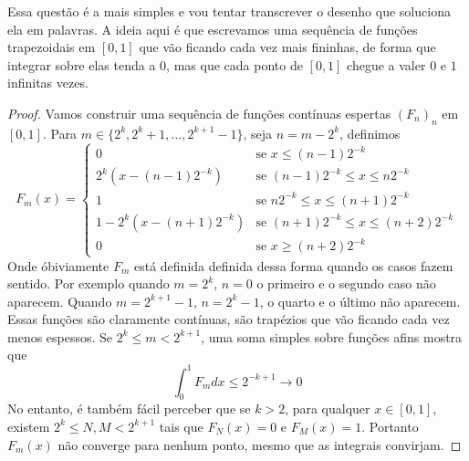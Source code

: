 \begin{problem}
    \label{prob:l3:5}
\end{problem}
Essa questão é a mais simples e vou tentar transcrever o desenho que soluciona ela em palavras.
A ideia aqui é que escrevamos uma sequência de funções trapezoidais em $[0,1]$ que vão ficando cada vez mais fininhas,
de forma que integrar sobre elas tenda a $0$, mas que cada ponto de $[0,1]$ chegue a valer $0$ e $1$ infinitas vezes.
\begin{proof}
    Vamos construir uma sequência de funções contínuas espertas $(F_n)_n$ em $[0,1]$.
    Para $m \in \{2^k, 2^k + 1, \dots, 2^{k+1} - 1\}$, seja $n = m - 2^k$, definimos
    $$F_{m}(x) = \begin{cases}
        0 & \text{se }  x \leq (n - 1)2^{-k}\\
        2^k(x - (n-1)2^{-k}) & \text{se } (n-1)2^{-k} \leq x \leq n2^{-k}\\
        1 &\text{se } n2^{-k} \leq x \leq (n+1)2^{-k}\\
        1 - 2^k(x - (n+1)2^{-k}) & \text{se } (n+1)2^{-k} \leq x \leq (n+2)2^{-k}\\
        0 & \text{se }  x \geq (n+2)2^{-k}
    \end{cases}$$
    Onde óbiviamente $F_m$ está definida definida dessa forma quando os casos fazem sentido.
    Por exemplo quando $m = 2^k$, $n=0$ o primeiro e o segundo caso não aparecem. Quando 
    $m = 2^{k+1} - 1$, $n = 2^{k} - 1$, o quarto e o último não aparecem. Essas funções são claramente contínuas, 
    são trapézios que vão ficando cada vez menos espessos. Se $2^k \leq m < 2^{k+1}$, uma soma simples 
    sobre funções afins mostra que 
    $$\int_0^1 F_m dx \leq 2^{-k + 1} \to 0$$
    No entanto, é também fácil perceber que se $k > 2$, para qualquer $x \in [0,1]$, existem $2^k \leq N,M < 2^{k+1}$
    tais que $F_N(x) = 0$ e $F_M(x) = 1$. Portanto $F_m(x)$ não converge para nenhum ponto, mesmo que as integrais convirjam. 
\end{proof}

